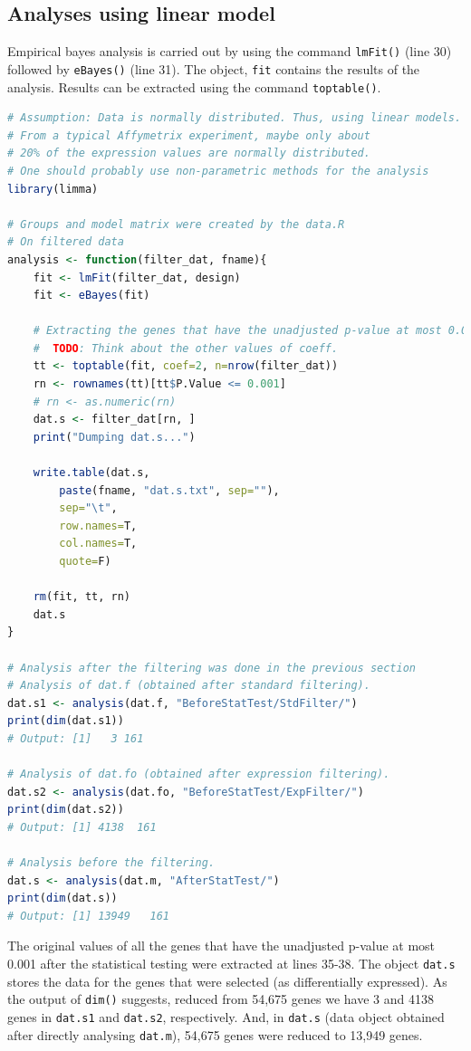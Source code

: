 \documentclass[oneside, a4paper, 11pt]{book}
\begin{document}
\subsection{Analyses using linear model}
Empirical bayes analysis is carried out by using the command \texttt{lmFit()} (line 30) followed by \texttt{eBayes()} (line 31). The object, \texttt{fit} contains the results of the analysis. Results can be extracted using the command \texttt{toptable()}.

\begin{lstlisting}[language=R, caption=Statistical Testing]
# Assumption: Data is normally distributed. Thus, using linear models.
# From a typical Affymetrix experiment, maybe only about
# 20% of the expression values are normally distributed.
# One should probably use non-parametric methods for the analysis
library(limma)

# Groups and model matrix were created by the data.R
# On filtered data
analysis <- function(filter_dat, fname){
    fit <- lmFit(filter_dat, design)
    fit <- eBayes(fit)

    # Extracting the genes that have the unadjusted p-value at most 0.001
    #  TODO: Think about the other values of coeff.
    tt <- toptable(fit, coef=2, n=nrow(filter_dat))
    rn <- rownames(tt)[tt$P.Value <= 0.001]
    # rn <- as.numeric(rn)
    dat.s <- filter_dat[rn, ]
    print("Dumping dat.s...")

    write.table(dat.s,
        paste(fname, "dat.s.txt", sep=""),
        sep="\t",
        row.names=T,
        col.names=T,
        quote=F)

    rm(fit, tt, rn)
    dat.s
}

# Analysis after the filtering was done in the previous section
# Analysis of dat.f (obtained after standard filtering).
dat.s1 <- analysis(dat.f, "BeforeStatTest/StdFilter/")
print(dim(dat.s1))
# Output: [1]   3 161

# Analysis of dat.fo (obtained after expression filtering).
dat.s2 <- analysis(dat.fo, "BeforeStatTest/ExpFilter/")
print(dim(dat.s2))
# Output: [1] 4138  161

# Analysis before the filtering.
dat.s <- analysis(dat.m, "AfterStatTest/")
print(dim(dat.s))
# Output: [1] 13949   161
\end{lstlisting}

The original values of all the genes that have the unadjusted p-value at most 0.001 after the statistical testing were extracted at lines 35-38. The object \texttt{dat.s} stores the data for the genes that were selected (as differentially expressed). As the output of \texttt{dim()} suggests, reduced from 54,675 genes we have 3 and 4138 genes in \texttt{dat.s1} and \texttt{dat.s2}, respectively. And, in \texttt{dat.s} (data object obtained after directly analysing \texttt{dat.m}), 54,675 genes were reduced to 13,949 genes.
\end{document}
